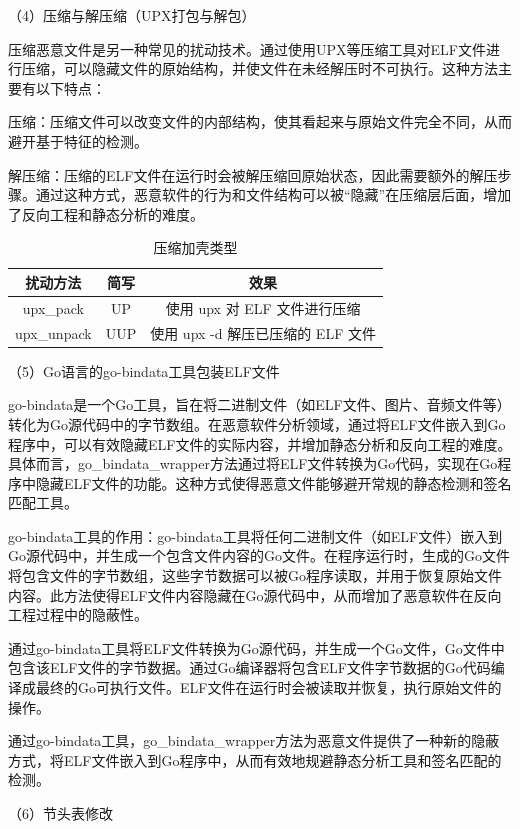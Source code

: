 （4）压缩与解压缩（UPX打包与解包）

压缩恶意文件是另一种常见的扰动技术。通过使用UPX等压缩工具对ELF文件进行压缩，可以隐藏文件的原始结构，并使文件在未经解压时不可执行。这种方法主要有以下特点：

压缩：压缩文件可以改变文件的内部结构，使其看起来与原始文件完全不同，从而避开基于特征的检测。

解压缩：压缩的ELF文件在运行时会被解压缩回原始状态，因此需要额外的解压步骤。通过这种方式，恶意软件的行为和文件结构可以被“隐藏”在压缩层后面，增加了反向工程和静态分析的难度。

\begin{table}[htbp]
	\centering
	\caption{压缩加壳类型}\label{tab:4.4}
	\begin{tabular*}{0.9\textwidth}{@{\extracolsep{\fill}}ccc}
		\toprule
		扰动方法 & 简写 & 效果 \\
		\midrule
		upx\_pack & UP & 使用 upx 对 ELF 文件进行压缩 \\
		upx\_unpack & UUP & 使用 upx -d 解压已压缩的 ELF 文件 \\
		\bottomrule
	\end{tabular*}
\end{table}

（5）Go语言的go-bindata工具包装ELF文件

go-bindata是一个Go工具，旨在将二进制文件（如ELF文件、图片、音频文件等）转化为Go源代码中的字节数组。在恶意软件分析领域，通过将ELF文件嵌入到Go程序中，可以有效隐藏ELF文件的实际内容，并增加静态分析和反向工程的难度。具体而言，go\_bindata\_wrapper方法通过将ELF文件转换为Go代码，实现在Go程序中隐藏ELF文件的功能。这种方式使得恶意文件能够避开常规的静态检测和签名匹配工具。

go-bindata工具的作用：go-bindata工具将任何二进制文件（如ELF文件）嵌入到Go源代码中，并生成一个包含文件内容的Go文件。在程序运行时，生成的Go文件将包含文件的字节数组，这些字节数据可以被Go程序读取，并用于恢复原始文件内容。此方法使得ELF文件内容隐藏在Go源代码中，从而增加了恶意软件在反向工程过程中的隐蔽性。

通过go-bindata工具将ELF文件转换为Go源代码，并生成一个Go文件，Go文件中包含该ELF文件的字节数据。通过Go编译器将包含ELF文件字节数据的Go代码编译成最终的Go可执行文件。ELF文件在运行时会被读取并恢复，执行原始文件的操作。

通过go-bindata工具，go\_bindata\_wrapper方法为恶意文件提供了一种新的隐蔽方式，将ELF文件嵌入到Go程序中，从而有效地规避静态分析工具和签名匹配的检测。

（6）节头表修改

